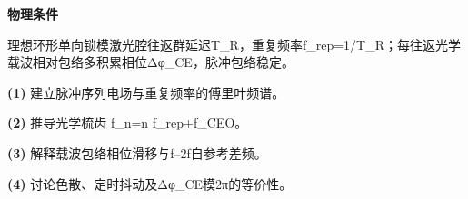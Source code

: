 \textbf{物理条件}\par 理想环形单向锁模激光腔往返群延迟T\_R，重复频率f\_rep=1/T\_R；每往返光学载波相对包络多积累相位Δφ\_CE，脉冲包络稳定。
\par\noindent\textbf{(1)} 建立脉冲序列电场与重复频率的傅里叶频谱。
\par\noindent\textbf{(2)} 推导光学梳齿 f\_n=n f\_rep+f\_CEO。
\par\noindent\textbf{(3)} 解释载波包络相位滑移与f–2f自参考差频。
\par\noindent\textbf{(4)} 讨论色散、定时抖动及Δφ\_CE模2π的等价性。
